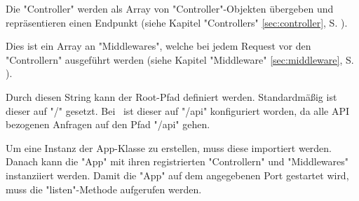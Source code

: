 
Die "Controller" werden als Array von "Controller"-Objekten übergeben und repräsentieren einen Endpunkt (siehe Kapitel "Controllers" \ref{sec:controller}, S. \pageref{sec:controller}).


Dies ist ein Array an "Middlewares", welche bei jedem Request vor den "Controllern" ausgeführt werden (siehe Kapitel "Middleware" \ref{sec:middleware}, S. \pageref{sec:middleware}).


Durch diesen String kann der Root-Pfad definiert werden. Standardmäßig ist dieser auf "{\ttfamily /}" gesetzt. Bei \ZELIA\ ist dieser auf "{\ttfamily /api}" konfiguriert worden, da alle API bezogenen Anfragen auf den Pfad "{\ttfamily /api}" gehen.

\label{sec:appUsage}

Um eine Instanz der App-Klasse zu erstellen, muss diese importiert werden. Danach kann die "App" mit ihren registrierten "Controllern" und "Middlewares" instanziiert werden. Damit die "App" auf dem angegebenen Port gestartet wird, muss die "listen"-Methode aufgerufen werden.

